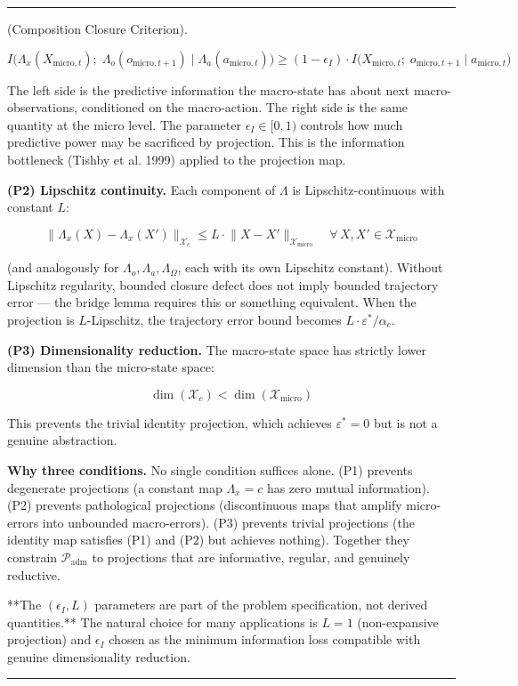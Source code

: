 \documentclass[11pt,oneside]{article}
\newcounter{claim}[section]
\renewcommand{\theclaim}{\thesection.\arabic{claim}}
\newenvironment{segment}[2]{%
  \refstepcounter{claim}%
  \bigskip\noindent\hrule\smallskip
  \noindent{\bfseries #1~\theclaim}\enskip(#2).\par\smallskip
  \noindent\ignorespaces
}{%
  \par\smallskip\noindent\hrule\bigskip
}
\newenvironment{formulation}[1][]{\begin{segment}{Formulation}{#1}}{\end{segment}}
\begin{document}
\begin{formulation}[Composition Closure Criterion]
$$I\big(\Lambda_x(X_{\text{micro},t});\; \Lambda_o(o_{\text{micro},t+1}) \mid \Lambda_a(a_{\text{micro},t})\big) \geq (1 - \epsilon_I) \cdot I\big(X_{\text{micro},t};\; o_{\text{micro},t+1} \mid a_{\text{micro},t}\big)$$

The left side is the predictive information the macro-state has about next macro-observations, conditioned on the macro-action. The right side is the same quantity at the micro level. The parameter $\epsilon_I \in [0, 1)$ controls how much predictive power may be sacrificed by projection. This is the information bottleneck (Tishby et al. 1999) applied to the projection map.

\textbf{(P2) Lipschitz continuity.} Each component of $\Lambda$ is Lipschitz-continuous with constant $L$:

$$\lVert \Lambda_x(X) - \Lambda_x(X') \rVert_{\mathcal X_c} \leq L \cdot \lVert X - X' \rVert_{\mathcal X_{\text{micro}}} \quad \forall\, X, X' \in \mathcal X_{\text{micro}}$$

(and analogously for $\Lambda_o, \Lambda_a, \Lambda_\Omega$, each with its own Lipschitz constant). Without Lipschitz regularity, bounded closure defect does not imply bounded trajectory error — the bridge lemma requires this or something equivalent. When the projection is $L$-Lipschitz, the trajectory error bound becomes $L \cdot \varepsilon^* / \alpha_c$.

\textbf{(P3) Dimensionality reduction.} The macro-state space has strictly lower dimension than the micro-state space:

$$\dim(\mathcal X_c) < \dim(\mathcal X_{\text{micro}})$$

This prevents the trivial identity projection, which achieves $\varepsilon^* = 0$ but is not a genuine abstraction.

\textbf{Why three conditions.} No single condition suffices alone. (P1) prevents degenerate projections (a constant map $\Lambda_x = c$ has zero mutual information). (P2) prevents pathological projections (discontinuous maps that amplify micro-errors into unbounded macro-errors). (P3) prevents trivial projections (the identity map satisfies (P1) and (P2) but achieves nothing). Together they constrain $\mathcal P_{\text{adm}}$ to projections that are informative, regular, and genuinely reductive.

**The $(\epsilon_I, L)$ parameters are part of the problem specification, not derived quantities.** The natural choice for many applications is $L = 1$ (non-expansive projection) and $\epsilon_I$ chosen as the minimum information loss compatible with genuine dimensionality reduction.


\end{formulation}
\end{document}

